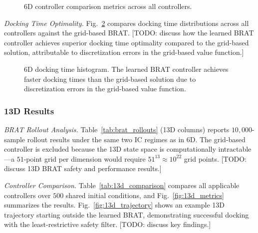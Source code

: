 \documentclass[letterpaper, 10 pt, conference]{ieeeconf}
\begin{document}
   \begin{figure}[t]
      \centering
      \caption{6D controller comparison metrics across all controllers.}
      \label{fig:6d_metrics}
   \end{figure}

\textit{Docking Time Optimality.}
Fig.~\ref{fig:6d_docking_hist} compares docking time distributions across all controllers against the grid-based BRAT. [TODO: discuss how the learned BRAT controller achieves superior docking time optimality compared to the grid-based solution, attributable to discretization errors in the grid-based value function.]

   \begin{figure}[t]
      \centering
      \caption{6D docking time histogram. The learned BRAT controller achieves faster docking times than the grid-based solution due to discretization errors in the grid-based value function.}
      \label{fig:6d_docking_hist}
   \end{figure}

\subsubsection{13D Results}\label{sec:13d_comparison}

\textit{BRAT Rollout Analysis.}
Table~\ref{tab:brat_rollouts} (13D columns) reports $10{,}000$-sample rollout results under the same two IC regimes as in 6D. The grid-based controller is excluded because the 13D state space is computationally intractable---a $51$-point grid per dimension would require $51^{13} \approx 10^{22}$ grid points. [TODO: discuss 13D BRAT safety and performance results.]

\textit{Controller Comparison.}
Table~\ref{tab:13d_comparison} compares all applicable controllers over $500$ shared initial conditions, and Fig.~\ref{fig:13d_metrics} summarizes the results. Fig.~\ref{fig:13d_trajectory} shows an example 13D trajectory starting outside the learned BRAT, demonstrating successful docking with the least-restrictive safety filter. [TODO: discuss key findings.]
\end{document}
